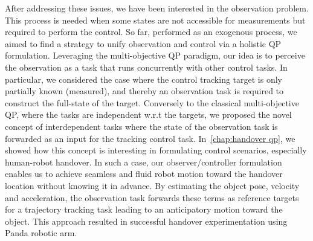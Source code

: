 After addressing these issues, we have been interested in the observation problem. This process is needed when some states are not accessible for measurements but required to perform the control. So far, performed as an exogenous process, we aimed to find a strategy to unify observation and control via a holistic QP formulation. Leveraging the multi-objective QP paradigm, our idea is to perceive the observation as a task that runs concurrently with other control tasks. In particular, we considered the case where the control tracking target is only partially known (measured), and thereby an observation task is required to construct the full-state of the target. Conversely to the classical multi-objective QP, where the tasks are independent w.r.t the targets, we proposed the novel concept of interdependent tasks where the state of the observation task is forwarded as an input for the tracking control task. In~\cref{chap:handover qp}, we showed how this concept is interesting in formulating control scenarios, especially human-robot handover. In such a case, our observer/controller formulation enables us to achieve seamless and fluid robot motion toward the handover location without knowing it in advance. By estimating the object pose, velocity and acceleration, the observation task forwards these terms as reference targets for a trajectory tracking task leading to an anticipatory motion toward the object. This approach resulted in successful handover experimentation using Panda robotic arm.  
 
